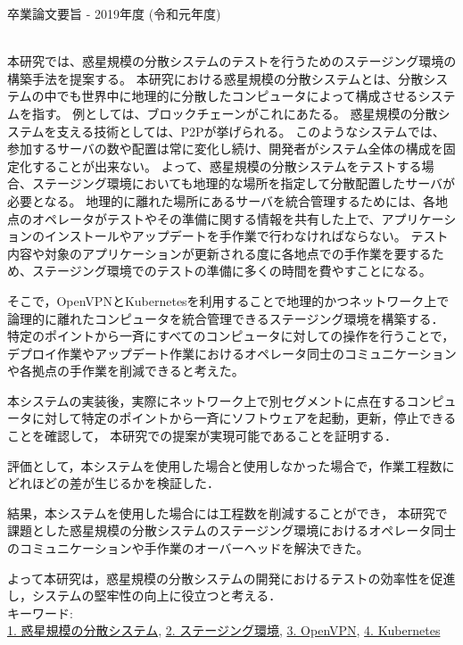 卒業論文要旨 - 2019年度 (令和元年度)
\begin{center}
\begin{large}
\end{large}
\end{center}

~ \\
本研究では、惑星規模の分散システムのテストを行うためのステージング環境の構築手法を提案する。
本研究における惑星規模の分散システムとは、分散システムの中でも世界中に地理的に分散したコンピュータによって構成させるシステムを指す。
例としては、ブロックチェーンがこれにあたる。
惑星規模の分散システムを支える技術としては、P2Pが挙げられる。
このようなシステムでは、参加するサーバの数や配置は常に変化し続け、開発者がシステム全体の構成を固定化することが出来ない。
よって、惑星規模の分散システムをテストする場合、ステージング環境においても地理的な場所を指定して分散配置したサーバが必要となる。
地理的に離れた場所にあるサーバを統合管理するためには、各地点のオペレータがテストやその準備に関する情報を共有した上で、アプリケーションのインストールやアップデートを手作業で行わなければならない。
テスト内容や対象のアプリケーションが更新される度に各地点での手作業を要するため、ステージング環境でのテストの準備に多くの時間を費やすことになる。

そこで，OpenVPNとKubernetesを利用することで地理的かつネットワーク上で論理的に離れたコンピュータを統合管理できるステージング環境を構築する．
特定のポイントから一斉にすべてのコンピュータに対しての操作を行うことで，デプロイ作業やアップデート作業におけるオペレータ同士のコミュニケーションや各拠点の手作業を削減できると考えた。

本システムの実装後，実際にネットワーク上で別セグメントに点在するコンピュータに対して特定のポイントから一斉にソフトウェアを起動，更新，停止できることを確認して，
本研究での提案が実現可能であることを証明する．

評価として，本システムを使用した場合と使用しなかった場合で，作業工程数にどれほどの差が生じるかを検証した．

結果，本システムを使用した場合には工程数を削減することができ，
本研究で課題とした惑星規模の分散システムのステージング環境におけるオペレータ同士のコミュニケーションや手作業のオーバーヘッドを解決できた。

よって本研究は，惑星規模の分散システムの開発におけるテストの効率性を促進し，システムの堅牢性の向上に役立つと考える．
~ \\
キーワード:\\
\underline{1. 惑星規模の分散システム},
\underline{2. ステージング環境},
\underline{3. OpenVPN},
\underline{4. Kubernetes}
\begin{flushright}
\dept \\
\author
\end{flushright}
